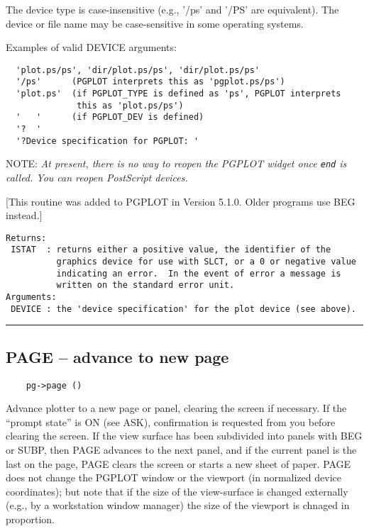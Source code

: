 The device type is case-insensitive (e.g., '/ps' and '/PS' are
equivalent).  The device or file name may be case-sensitive in some
operating systems.

Examples of valid DEVICE arguments:

\begin{verbatim}
  'plot.ps/ps', 'dir/plot.ps/ps', 'dir/plot.ps/ps'
  '/ps'      (PGPLOT interprets this as 'pgplot.ps/ps')
  'plot.ps'  (if PGPLOT_TYPE is defined as 'ps', PGPLOT interprets
              this as 'plot.ps/ps') 
  '   '      (if PGPLOT_DEV is defined)
  '?  '
  '?Device specification for PGPLOT: '
\end{verbatim}

NOTE: {\em At present, there is no way to reopen the PGPLOT widget
once {\tt end} is called.  You can reopen PostScript devices.}

[This routine was added to PGPLOT in Version 5.1.0.  Older programs
use BEG instead.]

\begin{verbatim}
Returns:
 ISTAT  : returns either a positive value, the identifier of the
          graphics device for use with SLCT, or a 0 or negative value
          indicating an error.  In the event of error a message is
          written on the standard error unit. 
Arguments:
 DEVICE : the 'device specification' for the plot device (see above). 
\end{verbatim}

\hrule

\subsection*{PAGE -- advance to new page }

\begin{verbatim}
    pg->page ()
\end{verbatim}

Advance plotter to a new page or panel, clearing the screen if
necessary.  If the ``prompt state'' is ON (see ASK), confirmation is
requested from you before clearing the screen.  If the view
surface has been subdivided into panels with BEG or SUBP, then PAGE
advances to the next panel, and if the current panel is the last on
the page, PAGE clears the screen or starts a new sheet of paper.  PAGE
does not change the PGPLOT window or the viewport (in normalized
device coordinates); but note that if the size of the view-surface is
changed externally (e.g., by a workstation window manager) the size of
the viewport is chnaged in proportion.

